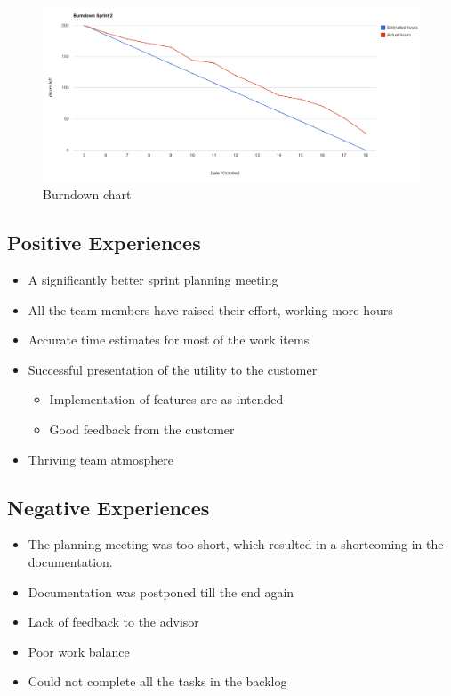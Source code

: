 \begin{figure}[!htb]
	\includegraphics[width=\textwidth]{./sprints/img/burndown_chart_s2}
	\caption{Burndown chart\label{fig:sp2:burndown}}
\end{figure}



\subsection{Positive Experiences}
\begin{itemize}
	\item A significantly better sprint planning meeting
	\item All the team members have raised their effort, working more hours
	\item Accurate time estimates for most of the work items
	\item Successful presentation of the \gls{utility} to the customer
	\begin {itemize}
		\item Implementation of features are as intended
		\item Good feedback from the customer
	\end{itemize}
	\item Thriving team atmosphere
\end{itemize}



\subsection{Negative Experiences}
\begin{itemize}
	\item The planning meeting was too short, which resulted in a shortcoming in the documentation.
	\item Documentation was postponed till the end again
	\item Lack of feedback to the advisor
	\item Poor work balance
	\item Could not complete all the tasks in the backlog
\end{itemize}


